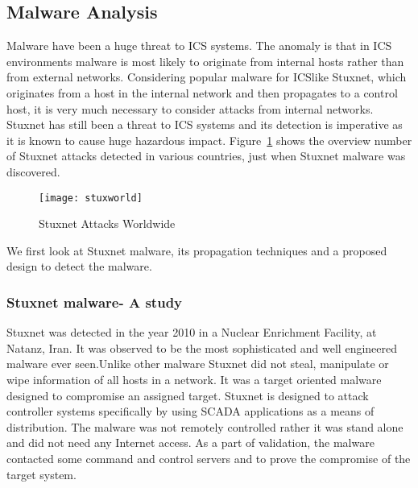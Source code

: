 \documentclass[article,msc=informatik,type=msc,colorback,accentcolor=tud9c]{tudthesis}
\begin{document}
	\subsection{Malware Analysis}\label{Malware Analysis}
	Malware have been a huge threat to \ac{ICS} systems. The anomaly is that in \ac{ICS} environments malware is most likely to originate from internal hosts rather than from external networks. 	Considering popular malware for \ac{ICS}like Stuxnet, which originates from a host in the internal network and then propagates to a control host, it is very much necessary to consider attacks from internal networks. Stuxnet has still been a threat to \ac{ICS} systems and its detection is imperative as it is known to cause huge hazardous impact. Figure~\ref{f:Stuxnet Attacks Worldwide} shows the overview number of Stuxnet attacks detected in various countries, just when Stuxnet malware was discovered.
	
	\begin{figure}[h]
	\centering
	        \texttt{[image: stuxworld]}
	        \caption[Stuxnet Attacks Worldwide]{\label{f:Stuxnet Attacks Worldwide}Stuxnet Attacks Worldwide }
	\end{figure}
	
	
	 We first look at Stuxnet malware, its  propagation techniques and a proposed design to detect the malware.

	\vspace{5mm}

	\subsubsection{Stuxnet malware- A study}\label{STUXNET Malware- A study}

	Stuxnet was detected in the year 2010 in a Nuclear Enrichment  Facility, at Natanz, Iran. It was observed to be the most sophisticated and well engineered malware ever seen.Unlike other malware Stuxnet did not steal, manipulate or wipe information of all hosts in a network. It was a target oriented malware designed to compromise an assigned target. Stuxnet is designed to attack controller systems specifically by using \ac{SCADA} applications as a means of distribution. The malware was not remotely controlled rather it was stand alone and did not need any Internet access. As a part of validation, the malware contacted some command and control servers and to prove the compromise of the target system.
	
\end{document}
